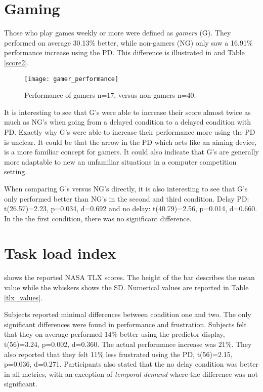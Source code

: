 \section{Gaming}

Those who play games weekly or more were defined as \emph{gamers} (G). They performed on average 30.13\% better, while non-gamers (NG) only saw a 16.91\% performance increase using the PD. This difference is illustrated in  and Table \ref{score2}.

\begin{figure}[h!]
	\vspace{-2mm}
    \centering
    \texttt{[image: gamer\_performance]}
    \caption{Performance of gamers n=17, versus non-gamers n=40.}
    \label{gamer_performance}
	\vspace{-3mm}
\end{figure}

It is interesting to see that G's were able to increase their score almost twice as much as NG's when going from a delayed condition to a delayed condition with PD. Exactly why G's were able to increase their performance more using the PD is unclear. It could be that the arrow in the PD which acts like an aiming device, is a more familiar concept for gamers. It could also indicate that G's are generally more adaptable to new an unfamiliar situations in a computer competition setting.

When comparing G's versus NG's directly, it is also interesting to see that G's only performed better than NG's in the second and third condition. Delay PD: t(26.57)=2.23, p=0.034, d=0.692 and no delay: t(40.79)=2.56, p=0.014, d=0.660. In the the first condition, there was no significant difference.

\section{Task load index}

 shows the reported NASA TLX scores. The height of the bar describes the mean value while the whiskers shows the SD. Numerical values are reported in Table \ref{tlx_values}.

Subjects reported minimal differences between condition one and two. The only significant differences were found in performance and frustration. Subjects felt that they on average performed 14\% better using the predictor display, t(56)=3.24, p=0.002, d=0.360. The actual performance increase was 21\%. They also reported that they felt 11\% less frustrated using the PD, t(56)=2.15, p=0.036, d=0.271. Participants also stated that the no delay condition was better in all metrics, with an exception of \emph{temporal demand} where the difference was not significant.

